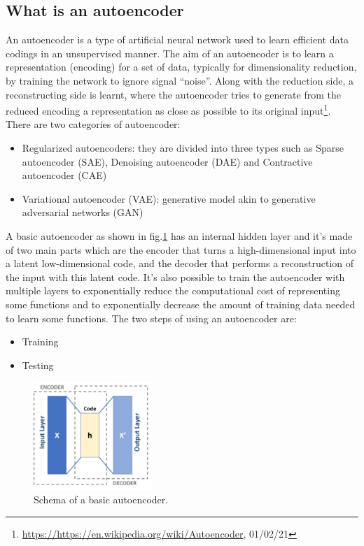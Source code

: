 \subsection{What is an autoencoder}
An autoencoder is a type of artificial neural network used to learn efficient data codings in an unsupervised manner. The aim of an autoencoder is to learn a representation (encoding) for a set of data, typically for dimensionality reduction, by training the network to ignore signal “noise”. Along with the reduction side, a reconstructing side is learnt, where the autoencoder tries to generate from the reduced encoding a representation as close as possible to its original input\footnote{\url{https://https://en.wikipedia.org/wiki/Autoencoder}, 01/02/21}.
There are two categories of autoencoder:
\begin{itemize}
\item Regularized autoencoders: they are divided into three types such as Sparse autoencoder (SAE), Denoising autoencoder (DAE) and Contractive autoencoder (CAE)
\item Variational autoencoder (VAE): generative model akin to generative adversarial networks (GAN)
\end{itemize}
A basic autoencoder as shown in fig.\ref{fig:autoencoder}  has an internal hidden layer and it's made of two main parts which are the encoder that turns a high-dimensional input into a latent low-dimensional code, and the decoder that performs a reconstruction of the input with this latent code. It's also possible to train the autoencoder with multiple layers to exponentially reduce the computational cost of representing some functions and to exponentially decrease the amount of training data needed to learn some functions. 
The two steps of using an autoencoder are:
\begin{itemize}
\item Training
\item Testing
\end{itemize}
\begin{figure}[h!]
    \centering
    \includegraphics[width=0.4\textwidth]{images/autoencoder.png}
    \caption{Schema of a basic autoencoder.}
    \label{fig:autoencoder}    
\end{figure}

